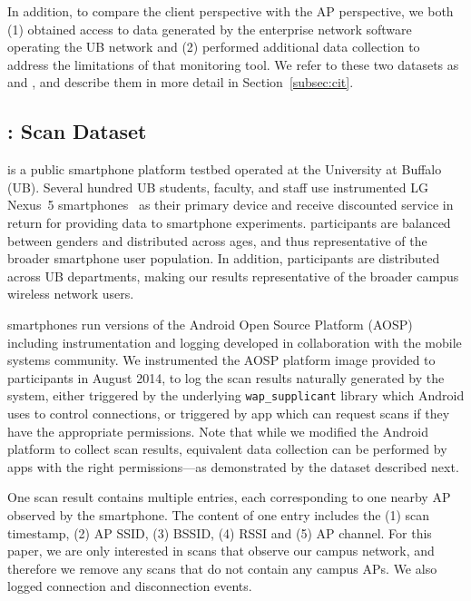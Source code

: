 In addition, to compare the client perspective with the AP perspective, we
both (1) obtained access to data generated by the enterprise network software
operating the UB \wifi{} network and (2) performed additional data collection
to address the limitations of that monitoring tool. We refer to these two
datasets as \textbf{\ubap{}} and \textbf{\ubapdetail{}}, and describe them in
more detail in Section~\ref{subsec:cit}.

\subsection{\ubscan{}: \PhoneLab{} \wifi{} Scan Dataset}
\label{sec:phonelab}

\PhoneLab{} is a public smartphone platform testbed operated at the
University at Buffalo (UB). Several hundred UB students, faculty, and staff
use instrumented LG Nexus~5 smartphones~\cite{nexus5} as their primary device
and receive discounted service in return for providing data to smartphone
experiments. \PhoneLab{} participants are balanced between genders and
distributed across ages, and thus representative of the broader smartphone
user population. In addition, \PhoneLab{} participants are distributed across
UB departments, making our results representative of the broader campus
wireless network users.

\PhoneLab{} smartphones run versions of the Android Open Source Platform
(AOSP) including instrumentation and logging developed in collaboration with
the mobile systems community. We instrumented the \PhoneLab{} AOSP platform
image provided to participants in August 2014, to log the \wifi{} scan
results naturally generated by the system, either triggered by the underlying
\texttt{wap\_supplicant} library which Android uses to control \wifi{}
connections, or triggered by app which can request scans if they have the
appropriate permissions. Note that while we modified the Android platform to
collect scan results, equivalent data collection can be performed by apps
with the right permissions---as demonstrated by the \ndscan{} dataset described
next.

One scan result contains multiple entries, each corresponding to one nearby
\wifi{} AP observed by the smartphone. The content of one entry includes the
(1) scan timestamp, (2) AP SSID, (3) BSSID, (4) RSSI and (5) AP channel. For
this paper, we are only interested in \wifi{} scans that observe our campus
network, and therefore we remove any scans that do not contain any campus
APs. We also logged \wifi{} connection and disconnection events.


